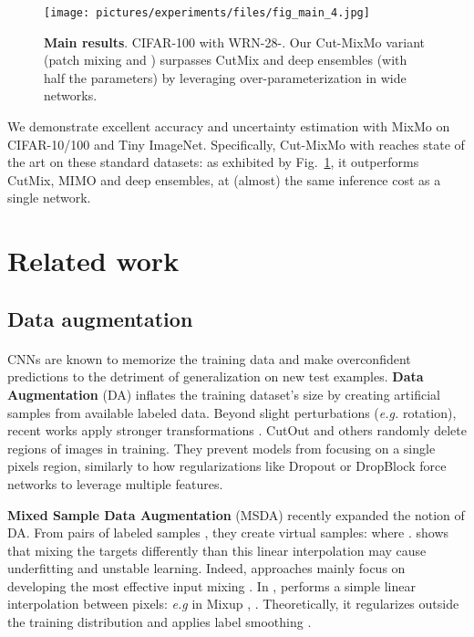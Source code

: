 \documentclass[10pt,twocolumn,letterpaper]{article}
\begin{document}
\begin{figure}[!t]\centering \texttt{[image: pictures/experiments/files/fig\_main\_4.jpg]}\caption{\textbf{Main results}. CIFAR-100 with WRN-28-. Our Cut-MixMo variant (patch mixing and ) surpasses CutMix and deep ensembles (with half the parameters) by leveraging over-parameterization in wide networks.}\label{fig:main}\end{figure}%
 We demonstrate excellent accuracy and uncertainty estimation with MixMo on CIFAR-10/100 and Tiny ImageNet.
Specifically, Cut-MixMo with  reaches state of the art on these standard datasets: as exhibited by Fig.~\ref{fig:main}, it outperforms CutMix, MIMO and deep ensembles, at (almost) the same inference cost as a single network.%
 \section{Related work}


\subsection{Data augmentation}

\paragraph{}CNNs are known to memorize the training data \cite{45820} and make
overconfident predictions \cite{guo2017calibration} to the detriment of generalization on new test examples. \textbf{Data Augmentation} (DA)
inflates the training dataset's size by creating artificial samples from
available labeled data. Beyond slight perturbations (\textit{e.g.} rotation), recent works \cite{Cubuk_2020_CVPR_Workshops, hendrycks2019augmix} apply stronger transformations \cite{he19_data_augmen_revis}. CutOut \cite{devries2017improved} and others
\cite{li2020encemask,singh2018hide,zhong2020random} randomly delete regions of
images in training. They prevent models from focusing on a single pixels region,
similarly to how regularizations like Dropout
\cite{srivastava2014dropout} or DropBlock \cite{ghiasi2018dropblock} force
networks to leverage multiple features.


\textbf{Mixed Sample Data Augmentation} (MSDA) recently expanded the notion of
DA. From pairs of labeled samples , they
create virtual samples:  where . 
\cite{liang2018understanding} shows that mixing the targets differently than this linear interpolation may cause
underfitting and unstable learning. Indeed, approaches mainly focus on developing the most effective input mixing . In \cite{inoue18_data_augmen_by_pairin_sampl_images_class,Tokozume_2018_CVPR,tokozume2018learning,zhang2018mixup},  performs a simple linear interpolation between pixels: \textit{e.g} in Mixup \cite{zhang2018mixup}, .  Theoretically, it regularizes outside the training distribution \cite{onmixup2020,guo2019mixup,zhang2020does,zhang2021hen} and applies label smoothing \cite{muller2019does,pereyra2017regularizing}.
\end{document}
